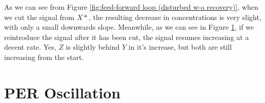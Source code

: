 \documentclass[]{article}
\begin{document}
\begin{enumerate}
\begin{figure}[!htbp]
		\label{fig:feed-forward loop (disturbed)}
	\end{figure}
	As we can see from Figure \ref{fig:feed-forward loop (disturbed w-o recovery)}, when we cut the signal from $X*$, the resulting decrease in concentrations is very slight, with only a small downwards slope. Meanwhile, as we can see in Figure \ref{fig:feed-forward loop (disturbed)}, if we reintroduce the signal after it has been cut, the signal resumes increasing at a decent rate. Yes, $Z$ is slightly behind $Y$ in it's increase, but both are still increasing from the start.

\end{enumerate}

\section{PER Oscillation}
\end{document}

